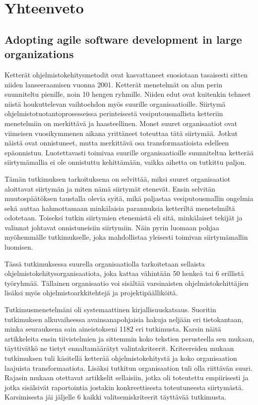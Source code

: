\documentclass[12pt]{article}
\date{}
\begin{document}
\section*{Yhteenveto}


\subsection*{Adopting agile software development in large organizations}


Ketterät ohjelmistokehitysmetodit ovat kasvattaneet suosiotaan
tasaisesti sitten niiden lanseeraamisen vuonna 2001. Ketterät
menetelmät on alun perin suunniteltu pienille, noin 10
hengen ryhmille. Niiden edut ovat kuitenkin tehneet niistä
houkuttelevan vaihtoehdon myös suurille organisaatioille. Siirtymä
ohjelmistotuotantoprosesseissa perinteisestä vesiputousmallista
ketteriin menetelmiin on merkittävä ja haasteellinen. Monet suuret
organisaatiot ovat viimeisen vuosikymmenen aikana yrittäneet toteuttaa
tätä siirtymää. Jotkut näistä ovat onnistuneet, mutta merkittävä
osa transformaatioista edelleen epäonnistuu. Luotettavasti toimivaa
suurille organisaatioille suunniteltua ketterää siirtymämallia ei ole
onnistuttu kehittämään, vaikka aihetta on tutkittu paljon.

Tämän tutkimuksen tarkoituksena on selvittää, miksi suuret
organisaatiot aloittavat siirtymän ja miten nämä siirtymät
etenevät. Ensin selvitän muutospäätöksen taustalla olevia syitä,
mikä paljastaa vesiputousmallin ongelmia sekä auttaa
hahmottamaan minkälaisia parannuksia ketteriltä menetelmiltä
odotetaan. Toiseksi tutkin siirtymien etenemistä eli sitä,
minkälaiset tekijät ja valinnat johtavat onnistuneisiin siirtymiin.
Näin pyrin luomaan pohjaa myöhemmälle tutkimukselle, joka
mahdollistaa yleisesti toimivan siirtymämallin luomisen.

Tässä tutkimuksessa suurella organisaatiolla tarkoitetaan sellaista
ohjelmistokehitysorganisaatiota, joka kattaa vähintään 50
henkeä tai 6 erillistä työryhmää. Tällainen organisaatio voi
sisältää varsinaisten ohjelmistokehittäjien lisäksi myös
ohjelmistoarkkitehtejä ja projektipäälliköitä.

Tutkimusmenetelmäni oli systemaattinen kirjallisuuskatsaus. Suoritin
tutkimuksen alkuvaiheessa avainsanapohjaisia hakuja neljään eri
tietokantaan, minka seurauksena sain aineistokseni 1182 eri tutkimusta.
Karsin näitä artikkeleita ensin tiivistelmien ja sittemmin
koko tekstien perusteella sen mukaan, täyttivätkö ne tietyt
ennaltamäärätyt valintakriteerit. Kriteereiden mukaan tutkimuksen
tuli käsitellä ketterää ohjelmistokehitystä ja koko organisaation
laajuista transformaatiota. Lisäksi tutkitun organisaation tuli olla
riittävän suuri. Rajasin mukaan otettavat artikkelit sellaisiin, jotka
oli toteutettu empiirisesti ja jotka sisälsivät raportointia jostakin
konkreettisesta toteutuneesta siirtymästä. Karsimisesta jäi jäljelle
6 kaikki valitsemiskriteerit täyttävää tutkimusta.
\end{document}
